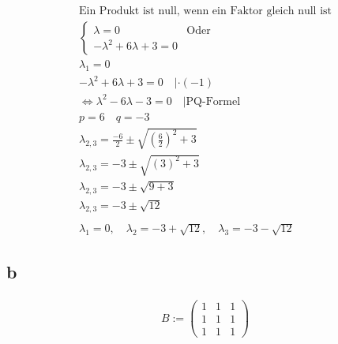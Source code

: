\begin{align*}
    \text{Ein Produkt ist null, wenn ein Faktor gleich null ist} \\
    \begin{cases}
        \lambda = 0 & \text{Oder} \\
        -\lambda^2 + 6\lambda + 3 = 0
    \end{cases} \\
    \lambda_1 = 0 \\
    -\lambda^2 + 6 \lambda + 3 = 0 \quad |\cdot (-1) \\
    \Leftrightarrow \lambda^2 - 6 \lambda - 3 = 0 \quad | \text{PQ-Formel} \\
    p = 6 \quad q = -3 \\
    \lambda_{2,3} = \frac{-6}{2} \pm \sqrt{\left(\frac{6}{2}\right)^2 + 3} \\
    \lambda_{2,3}= -3 \pm \sqrt{\left(3\right)^2 + 3} \\
    \lambda_{2,3}= -3 \pm \sqrt{9 + 3} \\
    \lambda_{2,3}= -3 \pm \sqrt{12} \\\\
    \lambda_1 = 0, \quad \lambda_2 = -3 + \sqrt{12}, \quad \lambda_3 = -3 - \sqrt{12}
\end{align*}

\subsection{b}

\begin{align*}
    B := \begin{pmatrix}
        1 & 1 & 1 \\
        1 & 1 & 1 \\
        1 & 1 & 1
    \end{pmatrix}
\end{align*}

